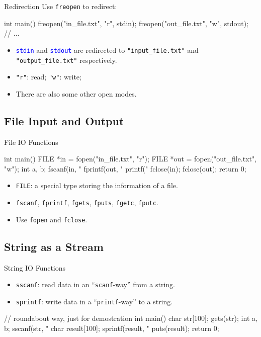 \documentclass{beamer}
\newcommand{\blue}[1]{\textcolor{blue}{#1}}
\newcommand{\ttt}[1]{\texttt{#1}}
\newcommand{\bluett}[1]{\blue{\ttt{#1}}}
\theoremstyle{definition}
\begin{document}
\begin{frame}[fragile]{Redirection}
    Use \ttt{freopen} to redirect:
    \begin{cpp}
int main() {
  freopen("in_file.txt", "r", stdin);
  freopen("out_file.txt", "w", stdout);
  // ...
}
    \end{cpp}
    \pause
    \begin{itemize}
        \item \bluett{stdin} and \bluett{stdout} are redirected to \ttt{"input\_file.txt"} and \ttt{"output\_file.txt"} respectively.
        \item \ttt{"r"}: read; \ttt{"w"}: write;
        \item There are also some other open modes.
    \end{itemize}
\end{frame}

\subsection{File Input and Output}

\begin{frame}[fragile]{File IO Functions}
    \begin{cpp}
int main() {
  FILE *in = fopen("in_file.txt", "r");
  FILE *out = fopen("out_file.txt", "w");
  int a, b;
  fscanf(in, "%
  fprintf(out, "%
  printf("%
  fclose(in);
  fclose(out);
  return 0;
}
    \end{cpp}
    \begin{itemize}
        \item \ttt{FILE}: a special type storing the information of a file.
        \item \ttt{fscanf}, \ttt{fprintf}, \ttt{fgets}, \ttt{fputs}, \ttt{fgetc}, \ttt{fputc}.
        \item Use \ttt{fopen} and \ttt{fclose}.
    \end{itemize}
\end{frame}

\subsection{String as a Stream}

\begin{frame}[fragile]{String IO Functions}
    \begin{itemize}
        \item \ttt{sscanf}: read data in an ``\ttt{scanf}-way'' from a string.
        \item \ttt{sprintf}: write data in a ``\ttt{printf}-way'' to a string.
    \end{itemize}
    \begin{cpp}
// roundabout way, just for demostration
int main() {
  char str[100];
  gets(str);
  int a, b;
  sscanf(str, "%
  char result[100];
  sprintf(result, "%
  puts(result);
  return 0;
}
    \end{cpp}
\end{frame}
\end{document}
